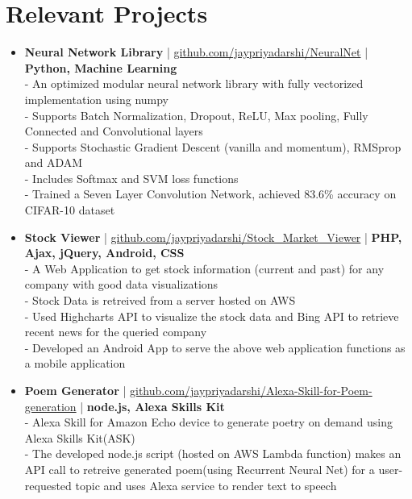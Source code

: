 \section{Relevant Projects}
\begin{itemize}
 \item \textbf{Neural Network Library} | \href{https://github.com/jaypriyadarshi/NeuralNet}{github.com/jaypriyadarshi/NeuralNet} | \textbf{Python, Machine Learning}\\
 - An optimized modular neural network library with fully vectorized implementation using numpy\\
 - Supports Batch Normalization, Dropout, ReLU, Max pooling, Fully Connected and Convolutional layers\\
 - Supports Stochastic Gradient Descent (vanilla and momentum), RMSprop and ADAM\\
 - Includes Softmax and SVM loss functions\\
 - Trained a Seven Layer Convolution Network, achieved 83.6\% accuracy on CIFAR-10 dataset 


 \item \textbf{Stock Viewer} | \href{https://github.com/jaypriyadarshi/Stock_Market_Viewer}{github.com/jaypriyadarshi/Stock\_Market\_Viewer} | \textbf{PHP, Ajax, jQuery, Android, CSS}\\
 - A Web Application to get stock information (current and past) for any company with good data visualizations\\
 - Stock Data is retreived from a server hosted on AWS\\
 - Used Highcharts API to visualize the stock data and Bing API to retrieve recent news for the queried company\\
 - Developed an Android App to serve the above web application functions as a mobile application

 \item \textbf{Poem Generator} | \href{https://github.com/jaypriyadarshi/Alexa-Skill-for-Poem-generation}{github.com/jaypriyadarshi/Alexa-Skill-for-Poem-generation} | \textbf{node.js, Alexa Skills Kit}\\
 - Alexa Skill for Amazon Echo device to generate poetry on demand using Alexa Skills Kit(ASK)\\
 - The developed node.js script (hosted on AWS Lambda function) makes an API call to retreive generated poem(using Recurrent Neural Net) for a user-requested topic and uses Alexa service to render text to speech


\end{itemize}
